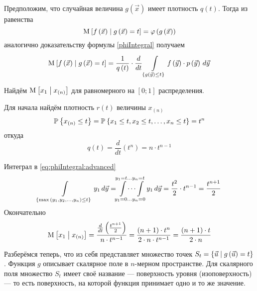 Предположим, что случайная величина $g\left( \vec{x} \right)$ имеет плотность
$q\left( t \right)$.
Тогда из равенства
\begin{equation*}
  \Mean{f\left( \vec{x} \right) \mcond g\left( \vec{x} \right) = t}
  = \varphi\left( g\left( \vec{x} \right) \right)
\end{equation*}
аналогично доказательству формулы \eqref{phiIntegral} получаем
\begin{equation}\label{eq:phiIntegral:advanced}
  \Mean{f\left( \vec{x} \right) \mcond g\left( \vec{x} \right) = t}
  = \frac{1}{q\left( t \right)}
    \cdot \frac{d}{dt} \integrall{
      \left\{ g\left( \vec{y} \right) \le t \right\} }{d\vec{y}}{
      f\left( \vec{y} \right) \cdot \pdf{\vec{y}}}
\end{equation}

\begin{example}
  Найдём $\Mean{x_1 \mcond x_{\left( n \right)}}$ для равномерного на
  $\left[ 0; 1 \right]$ распределения.

  Для начала найдём плотность $r\left( t \right)$ величины
  $x_{\left( n \right)}$
  \begin{equation*}
    \Probability{x_{\left( n \right)} \le t}
    = \Probability{x_1 \le t, x_2 \le t, \dots, x_n \le t}
    = t^n
  \end{equation*}
  откуда
  \begin{equation*}
    q\left( t \right) = \frac{d}{dt}\left( t^n \right) = n \cdot t^{n-1}
  \end{equation*}

  Интеграл в \eqref{eq:phiIntegral:advanced}
  \begin{equation*}
    \integrall{
      \left\{ \max{\left( y_1, y_2, \dots, y_n \right)} \le t \right\}}{
        d\vec{y}}{y_1}
    = \idotsint\limits_{y_1 = 0 \dots y_n = 0}^{y_1 = t \dots y_n = t}
      y_1 \, d\vec{y}
    = \frac{t^2}{2} \cdot t^{n-1} = \frac{t^{n+1}}{2}
  \end{equation*}
  Окончательно
  \begin{equation*}
    \Mean{x_1 \mcond x_{\left( n \right)}}
    = \frac{\frac{d}{dt} \left( \frac{t^{n+1}}{2} \right)}{n \cdot t^{n-1}}
    = \frac{\left( n+1 \right) \cdot t^n}{2 \cdot n \cdot t^{n-1}}
    = \frac{\left( n+1 \right) \cdot t}{2 \cdot n}
  \end{equation*}
\end{example}

Разберёмся теперь, что из себя представляет множество точек
$S_t = \left\{ \vec{u} \mcond g\left( \vec{u} \right) = t \right\}$.
Функция $g$ описывает скалярное поле в $n$-мерном пространстве.
Для скалярного поля множество $S_t$
имеет своё название --- поверхность уровня (изоповерхность) --- то есть
поверхность, на которой функция принимает одно и то же значение.

